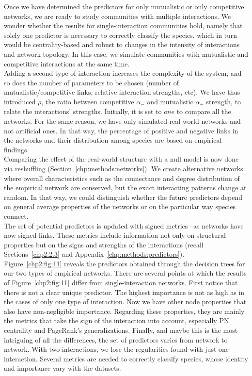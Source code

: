 Once we have determined the predictors for only mutualistic or only competitive networks, we are ready to study communities with multiple interactions. We wonder whether the results for single-interaction communities hold, namely that solely one predictor is necessary to correctly classify the species, which in turn would be centrality-based and robust to changes in the intensity of interactions and network topology. In this case, we simulate communities with mutualistic and competitive interactions at the same time. \\

Adding a second type of interaction increases the complexity of the system, and so does the number of parameters to be chosen (number of mutualistic/competitive links, relative interaction strengths, etc).  We have thus introduced $\rho$, the ratio between competitive $\alpha_-$ and mutualistic $\alpha_+$ strength, to relate the interactions' strengths. Initially, it is set to $one$ to compare all the networks. For the same reason, we have only simulated real-world networks and not artificial ones. In that way, the percentage of positive and negative links in the networks and their distribution among species are based on empirical findings.\\

Comparing the effect of the real-world structure with a null model is now done via reshuffling (Section~\ref{chp:methods:networks}). We create alternative networks where overall characteristics such as the connectance and degree distribution of the empirical network are conserved, but the exact interacting patterns change at random. In that way, we could distinguish whether the future predictors depend on general average properties of the networks or on the particular way species connect. \\

The set of potential predictors is updated with signed metrics --as networks have now signed links. These metrics include information not only on structural properties but on the signs and strengths of the interactions (recall  Sections~\ref{chp2:2.3} and Appendix~\ref{chp:methods:predictors}). \\

Figure~\ref{chp2:fig:11} reveals the predictors obtained through the decision trees for our two types of empirical networks. There are several points at which the results of Figure~\ref{chp2:fig:11} differ from single-interaction networks. First notice that there is not a clear unique predictor. The highest importance is not as high as in the cases of only one type of interaction. Now we have other node properties that also have non-negligible importance. Regarding these properties,  they are mainly the metrics that take the sign of the interaction into account, especially PN centrality and PageRank's generalizations. Finally, and maybe this is the most intriguing of all the differences, the set of predictors varies from network to network. With two interactions, we lose the regularities found with just one interaction. Several metrics are needed to correctly classify species, whose identity and importance vary with the datasets. \\

